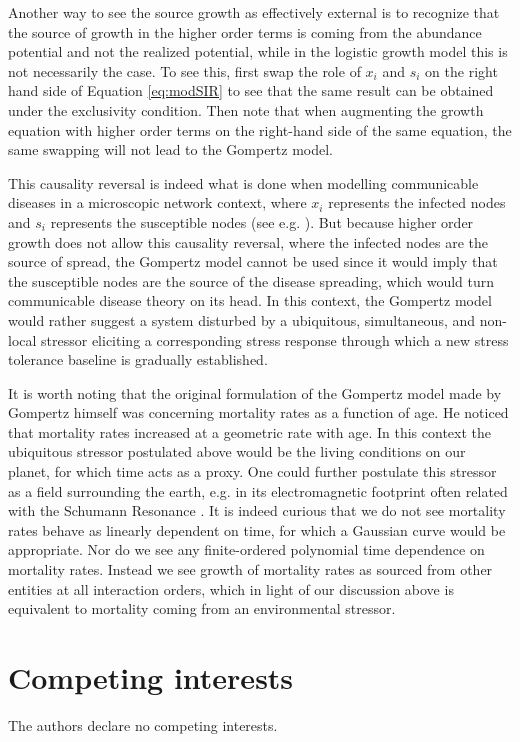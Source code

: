 \documentclass{article}
\begin{document}
Another way to see the source growth as effectively external is to recognize that the source of growth in the higher order terms is coming from the abundance potential and not the realized potential, while in the logistic growth model this is not necessarily the case. To see this, first swap the role of $x_i$ and $s_i$ on the right hand side of Equation \ref{eq:modSIR} to see that the same result can be obtained under the exclusivity condition. Then note that when augmenting the growth equation with higher order terms on the right-hand side of the same equation, the same swapping will not lead to the Gompertz model. 

This causality reversal is indeed what is done when modelling communicable diseases in a microscopic network context, where $x_i$ represents the infected nodes and $s_i$ represents the susceptible nodes (see e.g. \citet{estrada2022networked}). But because higher order growth does not allow this causality reversal, where the infected nodes are the source of spread, the Gompertz model cannot be used since it would imply that the susceptible nodes are the source of the disease spreading, which would turn communicable disease theory on its head. In this context, the Gompertz model would rather suggest a system disturbed by a ubiquitous, simultaneous, and non-local stressor eliciting a corresponding stress response through which a new stress tolerance baseline is gradually established.

It is worth noting that the original formulation of the Gompertz model made by Gompertz himself was concerning mortality rates as a function of age. He noticed that mortality rates increased at a geometric rate with age. In this context the ubiquitous stressor postulated above would be the living conditions on our planet, for which time acts as a proxy. One could further postulate this stressor as a field surrounding the earth, e.g. in its electromagnetic footprint often related with the Schumann Resonance \cite{cherry2002schumann,schumann1952strahlungslosen}. It is indeed curious that we do not see mortality rates behave as linearly dependent on time, for which a Gaussian curve would be appropriate. Nor do we see any finite-ordered polynomial time dependence on mortality rates. Instead we see growth of mortality rates as sourced from other entities at all interaction orders, which in light of our discussion above is equivalent to mortality coming from an environmental stressor.

\section*{Competing interests}
The authors declare no competing interests.
\end{document}
